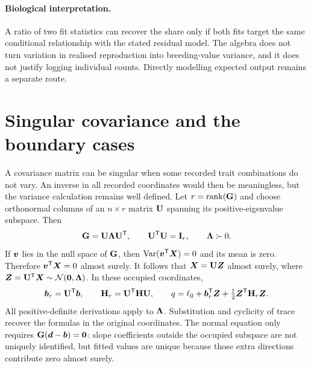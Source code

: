 \paragraph{Biological interpretation.}
A ratio of two fit statistics can recover the share only if both fits
target the same conditional relationship with the stated residual model.
The algebra does not turn variation in realised reproduction into
breeding-value variance, and it does not justify logging individual counts.
Directly modelling expected output remains a separate route.

\section{Singular covariance and the boundary cases}
\label{gaussian:singular_support}

A covariance matrix can be singular when some recorded trait combinations
do not vary. An inverse in all recorded coordinates would then be
meaningless, but the variance calculation remains well defined.
Let $r=\operatorname{rank}(\mathbf{G})$ and choose orthonormal columns of an
$n\times r$ matrix $\mathbf{U}$ spanning its positive-eigenvalue subspace.
Then
\begin{equation}
\mathbf{G}=\mathbf{U}\mathbf{\Lambda}\mathbf{U}^{\mathsf T},
\qquad \mathbf{U}^{\mathsf T}\mathbf{U}=\mathbf{I}_r,
\qquad \mathbf{\Lambda}\succ0.
\label{gaussian:support_decomposition}
\end{equation}
If $\boldsymbol{v}$ lies in the null space of $\mathbf{G}$, then
$\operatorname{Var}(\boldsymbol{v}^{\mathsf T}\boldsymbol{X})=0$ and its mean is zero. Therefore
$\boldsymbol{v}^{\mathsf T}\boldsymbol{X}=0$ almost surely. It follows that
$\boldsymbol{X}=\mathbf{U}\boldsymbol{Z}$ almost surely, where
$\boldsymbol{Z}=\mathbf{U}^{\mathsf T}\boldsymbol{X}\sim\mathcal N(\boldsymbol{0},\mathbf{\Lambda})$.
In these occupied coordinates,
\begin{equation}
\boldsymbol{b}_r=\mathbf{U}^{\mathsf T}\boldsymbol{b},
\qquad \mathbf{H}_r=\mathbf{U}^{\mathsf T}\mathbf{H}\mathbf{U},
\qquad
q=\ell_0+\boldsymbol{b}_r^{\mathsf T}\boldsymbol{Z}
       +\tfrac12\boldsymbol{Z}^{\mathsf T}\mathbf{H}_r\boldsymbol{Z}.
\end{equation}
All positive-definite derivations apply to $\mathbf{\Lambda}$. Substitution and
cyclicity of trace recover the formulas in the original coordinates.
The normal equation only requires
$\mathbf{G}(\boldsymbol{d}-\boldsymbol{b})=\boldsymbol{0}$: slope coefficients outside the occupied
subspace are not uniquely identified, but fitted values are unique because
those extra directions contribute zero almost surely.

